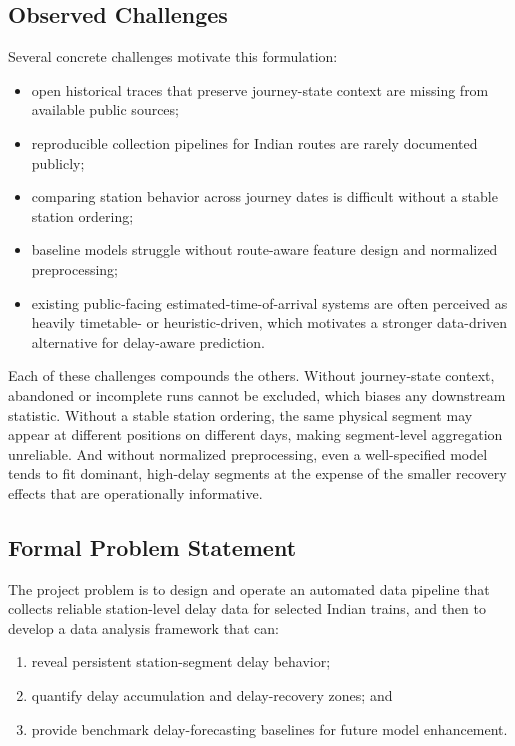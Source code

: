 \documentclass[conference]{IEEEtran}
\begin{document}
\subsection{Observed Challenges}
Several concrete challenges motivate this formulation:
\begin{itemize}
    \item open historical traces that preserve journey-state context are missing from available public sources;
    \item reproducible collection pipelines for Indian routes are rarely documented publicly;
    \item comparing station behavior across journey dates is difficult without a stable station ordering;
    \item baseline models struggle without route-aware feature design and normalized preprocessing;
    \item existing public-facing estimated-time-of-arrival systems are often perceived as heavily timetable- or heuristic-driven, which motivates a stronger data-driven alternative for delay-aware prediction.
\end{itemize}

Each of these challenges compounds the others. Without journey-state context, abandoned or incomplete runs cannot be excluded, which biases any downstream statistic. Without a stable station ordering, the same physical segment may appear at different positions on different days, making segment-level aggregation unreliable. And without normalized preprocessing, even a well-specified model tends to fit dominant, high-delay segments at the expense of the smaller recovery effects that are operationally informative.

\subsection{Formal Problem Statement}
The project problem is to design and operate an automated data pipeline that collects reliable station-level delay data for selected Indian trains, and then to develop a data analysis framework that can:
\begin{enumerate}
    \item reveal persistent station-segment delay behavior;
    \item quantify delay accumulation and delay-recovery zones; and
    \item provide benchmark delay-forecasting baselines for future model enhancement.
\end{enumerate}
\end{document}
